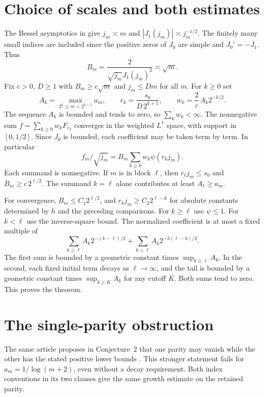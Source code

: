 \documentclass[11pt]{amsart}
\begin{document}
\section{Choice of scales and both estimates}
The Bessel asymptotics in \cite[Lemma~2.2]{acosta} give
\(j_m\asymp m\) and \(|J_1(j_m)|\asymp j_m^{-1/2}\).
The finitely many small indices are included since the positive
zeros of \(J_0\) are simple and \(J_0'=-J_1\).
Thus
\[
   B_m=\frac{2}{\sqrt{j_m}J_1(j_m)^2}\asymp\sqrt m.
\]
Fix \(c>0\), \(D\ge1\) with \(B_m\ge c\sqrt m\) and
\(j_m\le Dm\) for all \(m\). For \(k\ge0\) set
\[
  A_k=\max_{2^k\le m<2^{k+1}}a_m,\qquad
  r_k=\frac{s_0}{D\,2^{k+1}},\qquad
  w_k=\frac2c\,A_k2^{-k/2}.
\]
The sequence \(A_k\) is bounded and tends to zero, so
\(\sum_k w_k<\infty\). The nonnegative sum
\(f=\sum_{k\ge0}w_kF_{r_k}\) converges in the weighted
\(L^1\) space, with support in \([0,1/2]\).
Since \(J_0\) is bounded, each coefficient may be taken
term by term. In particular
\[
                  f_m/\sqrt{j_m}=B_m\sum_{k\ge0}w_k\psi(r_k j_m).
\]
Each summand is nonnegative. If \(m\) is in block \(\ell\),
then \(r_\ell j_m\le s_0\) and
\(B_m\ge c\,2^{\ell/2}\). The summand \(k=\ell\) alone
contributes at least \(A_\ell\ge a_m\).

For convergence, \(B_m\le C_1 2^{\ell/2}\), and
\(r_kj_m\ge C_2 2^{\ell-k}\) for absolute constants determined
by \(h\) and the preceding comparisons. For \(k\ge\ell\) use
\(\psi\le1\). For \(k<\ell\) use the inverse-square bound.
The normalized coefficient is at most a fixed multiple of
\[
       \sum_{k\ge\ell} A_k2^{-(k-\ell)/2}
         + \sum_{k<\ell} A_k2^{-3(\ell-k)/2}.
\]
The first sum is bounded by a geometric constant times
\(\sup_{k\ge\ell}A_k\). In the second, each fixed initial term
decays as \(\ell\to\infty\), and the tail is bounded by a
geometric constant times \(\sup_{k\ge K} A_k\) for any cutoff
\(K\). Both sums tend to zero. This proves the theorem.

\section{The single-parity obstruction}
The same article proposes in Conjecture~2 that one parity may
vanish while the other has the stated positive lower bounds
\cite[p.~13]{acosta}. This stronger statement fails for
\(a_m=1/\log(m+2)\), even without a decay requirement.
Both index conventions in its two clauses give the same
growth estimate on the retained parity.
\end{document}
